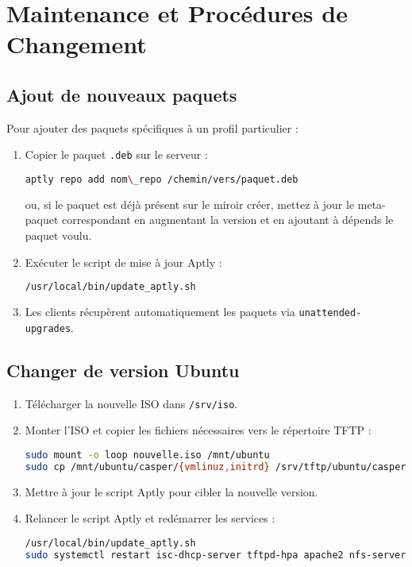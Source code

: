 \documentclass[a4paper,12pt]{article}
\begin{document}
\section{Maintenance et Procédures de Changement}
\subsection{Ajout de nouveaux paquets}
Pour ajouter des paquets spécifiques à un profil particulier :

\begin{enumerate}
\item Copier le paquet \texttt{.deb} sur le serveur :
\begin{lstlisting}[language=bash]
aptly repo add nom\_repo /chemin/vers/paquet.deb
\end{lstlisting}
ou, si le paquet est déjà présent sur le miroir créer, mettez à jour le meta-paquet correspondant en augmentant la version et en ajoutant à dépends le paquet voulu.
\item Exécuter le script de mise à jour Aptly :
\begin{lstlisting}[language=bash]
/usr/local/bin/update_aptly.sh
\end{lstlisting}
\item Les clients récupèrent automatiquement les paquets via \texttt{unattended-upgrades}.
\end{enumerate}

\subsection{Changer de version Ubuntu}
\begin{enumerate}
\item Télécharger la nouvelle ISO dans \texttt{/srv/iso}.
\item Monter l’ISO et copier les fichiers nécessaires vers le répertoire TFTP :
\begin{lstlisting}[language=bash]
sudo mount -o loop nouvelle.iso /mnt/ubuntu
sudo cp /mnt/ubuntu/casper/{vmlinuz,initrd} /srv/tftp/ubuntu/casper/
\end{lstlisting}
\item Mettre à jour le script Aptly pour cibler la nouvelle version.
\item Relancer le script Aptly et redémarrer les services :
\begin{lstlisting}[language=bash]
/usr/local/bin/update_aptly.sh
sudo systemctl restart isc-dhcp-server tftpd-hpa apache2 nfs-server
\end{lstlisting}
\end{enumerate}
\end{document}
